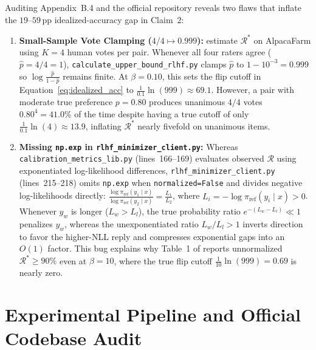 \documentclass[11pt]{article}
\theoremstyle{plain}
\theoremstyle{definition}
\newcommand{\piref}{\pi_{\mathrm{ref}}}
\newcommand{\Racc}{\mathcal{R}}
\begin{document}
Auditing Appendix~B.4 and the official repository reveals two flaws that inflate the $19\text{--}59$\,pp idealized-accuracy gap in Claim~2:
\begin{enumerate}[leftmargin=1.8em,itemsep=2pt,topsep=2pt]
  \item \textbf{Small-Sample Vote Clamping ($4/4 \mapsto 0.999$):} \citet{chen2024preference} estimate $\Racc^*$ on AlpacaFarm \citep{dubois2023alpacafarm} using $K = 4$ human votes per pair. Whenever all four raters agree ($\hat{p} = 4/4 = 1$), \texttt{calculate\_upper\_bound\_rlhf.py} clamps $\hat{p}$ to $1 - 10^{-3} = 0.999$ so $\log \frac{\hat{p}}{1-\hat{p}}$ remains finite. At $\beta = 0.10$, this sets the flip cutoff in Equation~\eqref{eq:idealized_acc} to $\frac{1}{0.1}\ln(999) \approx 69.1$. However, a pair with moderate true preference $p = 0.80$ produces unanimous $4/4$ votes $0.80^4 = 41.0\%$ of the time despite having a true cutoff of only $\frac{1}{0.1}\ln(4) \approx 13.9$, inflating $\Racc^*$ nearly fivefold on unanimous items.
  \item \textbf{Missing \texttt{np.exp} in \texttt{rlhf\_minimizer\_client.py}:} Whereas \texttt{calibration\_metrics\_lib.py} (lines~166--169) evaluates observed $\Racc$ using exponentiated log-likelihood differences, \texttt{rlhf\_minimizer\_client.py} (lines~215--218) omits \texttt{np.exp} when \texttt{normalized=False} and divides negative log-likelihoods directly: $\frac{\log \piref(y_1 \mid x)}{\log \piref(y_2 \mid x)} = \frac{L_1}{L_2}$, where $L_i = -\log \piref(y_i \mid x) > 0$. Whenever $y_w$ is longer ($L_w > L_l$), the true probability ratio $e^{-(L_w - L_l)} \ll 1$ penalizes $y_w$, whereas the unexponentiated ratio $L_w / L_l > 1$ inverts direction to favor the higher-NLL reply and compresses exponential gaps into an $O(1)$ factor. This bug explains why Table~1 of \citet{chen2024preference} reports unnormalized $\Racc^* \ge 90\%$ even at $\beta = 10$, where the true flip cutoff $\frac{1}{10}\ln(999) = 0.69$ is nearly zero.
\end{enumerate}

\section{Experimental Pipeline and Official Codebase Audit}
\label{sec:setup}
\end{document}
